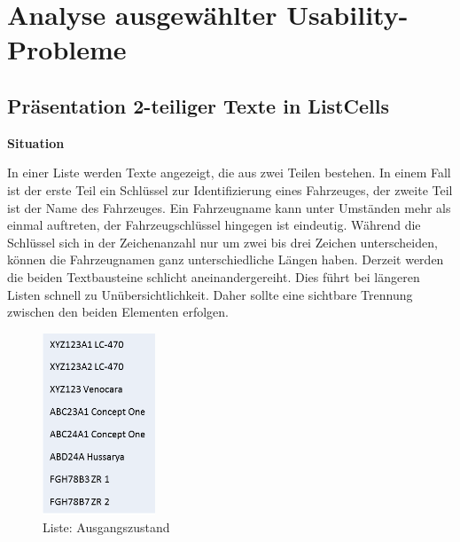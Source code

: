 \chapter{Analyse ausgewählter Usability-Probleme}
\section{Präsentation 2-teiliger Texte in ListCells} \label{sec:analyseListCells}
\textbf{Situation}

In einer Liste werden Texte angezeigt, die aus zwei Teilen bestehen. In einem Fall ist der erste Teil ein Schlüssel zur Identifizierung eines Fahrzeuges, der zweite Teil ist der Name des Fahrzeuges. Ein Fahrzeugname kann unter Umständen mehr als einmal auftreten, der Fahrzeugschlüssel hingegen ist eindeutig. Während die Schlüssel sich in der Zeichenanzahl nur um zwei bis drei Zeichen unterscheiden, können die Fahrzeugnamen ganz unterschiedliche Längen haben. Derzeit werden die beiden Textbausteine schlicht aneinandergereiht. Dies führt bei längeren Listen schnell zu Unübersichtlichkeit. Daher sollte eine sichtbare Trennung zwischen den beiden Elementen erfolgen.

\begin{figure}[H]
 \centering
 \includegraphics[width=0.3\textwidth]{grafiken/Liste_Beispiel.png}
 \caption{Liste: Ausgangszustand}
 \label{fig:liste1}
\end{figure}

